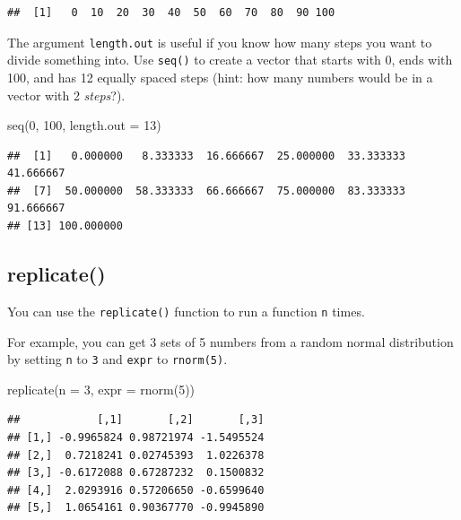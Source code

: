 \documentclass[
  oneside]{book}
\newenvironment{Shaded}{\begin{snugshade}}{\end{snugshade}}
\newcommand{\AttributeTok}[1]{\textcolor[rgb]{0.77,0.63,0.00}{#1}}
\newcommand{\DecValTok}[1]{\textcolor[rgb]{0.00,0.00,0.81}{#1}}
\newcommand{\FunctionTok}[1]{\textcolor[rgb]{0.00,0.00,0.00}{#1}}
\newcommand{\NormalTok}[1]{#1}
\begin{document}
\begin{verbatim}
##  [1]   0  10  20  30  40  50  60  70  80  90 100
\end{verbatim}

The argument \texttt{length.out} is useful if you know how many steps you want to divide something into. Use \texttt{seq()} to create a vector that starts with 0, ends with 100, and has 12 equally spaced steps (hint: how many numbers would be in a vector with 2 \emph{steps}?).

\begin{Shaded}
\begin{Highlighting}[]
\FunctionTok{seq}\NormalTok{(}\DecValTok{0}\NormalTok{, }\DecValTok{100}\NormalTok{, }\AttributeTok{length.out =} \DecValTok{13}\NormalTok{)}
\end{Highlighting}
\end{Shaded}

\begin{verbatim}
##  [1]   0.000000   8.333333  16.666667  25.000000  33.333333  41.666667
##  [7]  50.000000  58.333333  66.666667  75.000000  83.333333  91.666667
## [13] 100.000000
\end{verbatim}

\hypertarget{replicate}{%
\subsection{replicate()}\label{replicate}}

You can use the \texttt{replicate()} function to run a function \texttt{n} times.

For example, you can get 3 sets of 5 numbers from a random normal distribution by setting \texttt{n} to \texttt{3} and \texttt{expr} to \texttt{rnorm(5)}.

\begin{Shaded}
\begin{Highlighting}[]
\FunctionTok{replicate}\NormalTok{(}\AttributeTok{n =} \DecValTok{3}\NormalTok{, }\AttributeTok{expr =} \FunctionTok{rnorm}\NormalTok{(}\DecValTok{5}\NormalTok{))}
\end{Highlighting}
\end{Shaded}

\begin{verbatim}
##            [,1]       [,2]       [,3]
## [1,] -0.9965824 0.98721974 -1.5495524
## [2,]  0.7218241 0.02745393  1.0226378
## [3,] -0.6172088 0.67287232  0.1500832
## [4,]  2.0293916 0.57206650 -0.6599640
## [5,]  1.0654161 0.90367770 -0.9945890
\end{verbatim}
\end{document}
